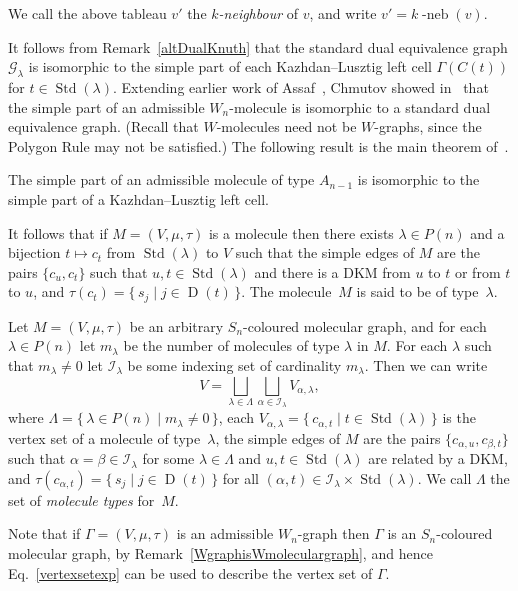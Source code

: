 \documentclass[ALCO,ThmDefs,Unicode,epreuves]{cedram}
\newcommand{\citex}[2]{\cite[#1]{#2}}
\DeclareMathOperator{\STD}{Std}
\DeclareMathOperator{\neb}{-neb}
\DeclareMathOperator{\D}{D}
\begin{document}
\begin{defi}\label{k-neighbourdefinition}
We call the above tableau $v'$ the \emph{$k$-neighbour} of $v$, and write
$v'=k\neb(v)$.
\end{defi}
It follows from Remark~\ref{altDualKnuth} that the standard
dual equivalence graph $\mathcal{G}_{\lambda}$ is isomorphic to
the simple part of each Kazhdan--Lusztig left cell $\Gamma(C(t))$ for
$t\in\STD(\lambda)$.
Extending earlier work of Assaf~\cite{assaf:dualequigraphs}, Chmutov showed
in~\cite{ChuMic:typeAMol} that the simple part of an admissible $W_n$-molecule
is isomorphic to a standard dual equivalence graph. (Recall that
$W\!$-molecules need not be $W\!$-graphs, since the
Polygon Rule may not be satisfied.) The following result is
the main theorem of~\cite{ChuMic:typeAMol}.

\begin{theo}[{\citex{Theorem~2}{ChuMic:typeAMol}}]\label{molIsKL}
The simple part of an admissible molecule of type $A_{n-1}$ is
isomorphic to the simple part of a Kazhdan--Lusztig left cell.
\end{theo}

\begin{rema}\label{vertexsetofWngraph}
It follows that if $M=(V,\mu,\tau)$ is a molecule then there exists $\lambda\in P(n)$ and
a bijection $t\mapsto c_t$ from $\STD(\lambda)$ to $V$ such that
the simple edges of $M$ are the pairs $\{c_u,c_t\}$ such that $u,t\in\STD(\lambda)$ and there is a
DKM from $u$ to $t$ or from $t$ to $u$, and $\tau(c_t)=\{\,s_j\mid j\in\D(t)\,\}$.
The molecule~$M$ is said to be of type~$\lambda$.

Let $M=(V,\mu,\tau)$ be an arbitrary $S_n$-coloured molecular graph, and for
each $\lambda\in P(n)$ let $m_{\lambda}$
be the number of molecules of type $\lambda$ in $M$. For each $\lambda$ such
that $m_{\lambda}\neq 0$ let $\mathcal{I}_{\lambda}$ be some indexing set of
cardinality $m_{\lambda}$. Then we can write
\begin{equation}\label{vertexsetexp}
V = \bigsqcup_{\lambda\in\Lambda}\bigsqcup_{\alpha\in\mathcal{I}_{\lambda}}V_{\alpha,\lambda},
\end{equation}
where $\Lambda=\{\,\lambda\in P(n)\mid m_{\lambda}\neq 0\,\}$, each
$V_{\alpha,\lambda}=\{\,c_{\alpha,t}\mid t\in\STD(\lambda)\,\}$ is the vertex set
of a molecule of type~$\lambda$, the simple edges of $M$ are the pairs
$\{c_{\alpha,u},c_{\beta,t}\}$ such that $\alpha=\beta\in\mathcal{I}_{\lambda}$
for some $\lambda\in\Lambda$ and $u,t\in\STD(\lambda)$ are related by a
DKM, and $\tau(c_{\alpha,t})=\{\,s_j\mid j\in\D(t)\,\}$ for all $(\alpha,t)\in\mathcal{I}_\lambda\times\STD(\lambda)$.
We call $\Lambda$ the set of \emph{molecule types} for~$M$.

Note that if $\Gamma=(V,\mu,\tau)$ is an admissible $W_n$-graph then $\Gamma$
is an $S_n$-coloured molecular graph, by Remark~\ref{WgraphisWmoleculargraph}, and
hence Eq.~\eqref{vertexsetexp} can be used to describe the vertex set of $\Gamma$.
\end{rema}
\end{document}
